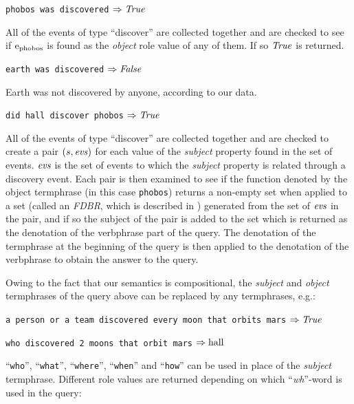 \documentclass[../main.tex]{subfiles}
\begin{document}
\begin{refsection}
\examplespacing

\texttt{phobos was discovered} $\Rightarrow \operatorname{\mathit{True}}$

\examplespacing

\noindent All of the events of type ``discover'' are collected together and are checked to see if $\mathrm{e}_{\operatorname{phobos}}$ is found as the \textit{object} role value of any of them. If so $\operatorname{\mathit{True}}$ is returned.

\examplespacing

\texttt{earth was discovered} $\Rightarrow \operatorname{\mathit{False}}$

\examplespacing

\noindent Earth was not discovered by anyone, according to our data.

\examplespacing

\texttt{did hall discover phobos} $\Rightarrow \operatorname{\mathit{True}}$

\examplespacing

\noindent All of the events of type ``discover'' are collected together and are checked to create a pair $(s, \operatorname{\mathit{evs}})$ for each value of the \textit{subject} property found in the set of events. $\operatorname{\mathit{evs}}$ is the set of events to which the \textit{subject} property is related through a discovery event.  Each pair is then examined to see if the function denoted by the object termphrase (in this case \texttt{phobos}) returns a non-empty set when applied to a set (called an \textit{FDBR}, which is described in ) generated from the set of $\operatorname{\mathit{evs}}$ in the pair, and if so the subject of the pair is added to the set which is returned as the denotation of the verbphrase part of the query. The denotation of the termphrase at the beginning of the query is then applied to the denotation of the verbphrase to obtain the answer to the query. %

Owing to the fact that our semantics is compositional, the \textit{subject} and \textit{object} termphrases of the query above can be replaced by any termphrases, e.g.:

\examplespacing

\texttt{a person or a team  discovered every moon that orbits mars} $\Rightarrow \operatorname{\mathit{True}}$

\texttt{who discovered 2 moons that orbit mars} $\Rightarrow \operatorname{hall}$

\examplespacing

\noindent ``\texttt{who}'', ``\texttt{what}'', ``\texttt{where}'', ``\texttt{when}'' and ``\texttt{how}'' can be used in place of the \textit{subject} termphrase. Different role values are returned depending on which ``\textit{wh}''-word is used in the query:


\end{refsection}
\end{document}
